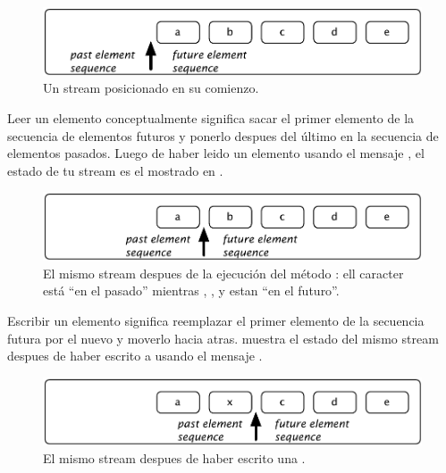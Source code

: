 \documentclass[a4paper,10pt,twoside]{book}
\begin{document}
\begin{figure}[ht]
\centerline{\includegraphics[scale=0.5]{_abcdeStef}}
\caption{Un stream posicionado en su comienzo.}
\vspace{.2in}
\end{figure}

Leer un elemento conceptualmente significa sacar el primer elemento de la secuencia de elementos futuros y ponerlo despues del \'ultimo en
la secuencia de elementos pasados. Luego de haber leido un elemento usando el mensaje , el estado de tu stream es el mostrado en .

\begin{figure}[ht]
\centerline{\includegraphics[scale=0.5]{a_bcdeStef}}
\caption{El mismo stream despues de la ejecuci\'on del m\'etodo : ell caracter  est\'a ``en el pasado'' mientras , ,  y
  estan ``en el futuro''.}
\vspace{.2in}
\end{figure}

Escribir un elemento significa reemplazar el primer elemento de la secuencia futura por el nuevo y moverlo hacia atras.
  muestra el estado del mismo stream despues de haber escrito a  usando el mensaje  .

\begin{figure}[h!t]
\centerline{\includegraphics[scale=0.5]{ax_cdeStef}}
\caption{El mismo stream despues de haber escrito una .}
\vspace{.2in}
\end{figure}
\end{document}
